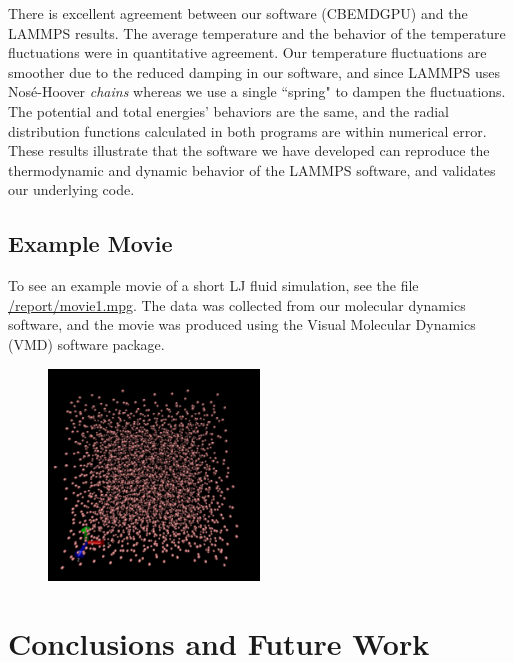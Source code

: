 \documentclass[12pt]{article}
\begin{document}
There is excellent agreement between our software (CBEMDGPU) and the LAMMPS results. The average temperature and the behavior of the temperature fluctuations were in quantitative agreement. Our temperature fluctuations are smoother due to the reduced damping in our software, and since LAMMPS uses Nos\'{e}-Hoover \emph{chains} whereas we use a single ``spring" to dampen the fluctuations. The potential and total energies' behaviors are the same, and the radial distribution functions calculated in both programs are within numerical error. These results illustrate that the software we have developed can reproduce the thermodynamic and dynamic behavior of the LAMMPS software, and validates our underlying code.

\subsection{Example Movie}
To see an example movie of a short LJ fluid simulation, see the file \url{/report/movie1.mpg}.
%
The data was collected from our molecular dynamics software, and the movie was produced using the Visual Molecular Dynamics (VMD) \cite{HUMP96} software package. 

\begin{figure}[H]
	\begin{center}
    	\includegraphics[width=0.5\textwidth]{vmd_image.png}
	\end{center}
\end{figure}
\section{Conclusions and Future Work}
\end{document}
